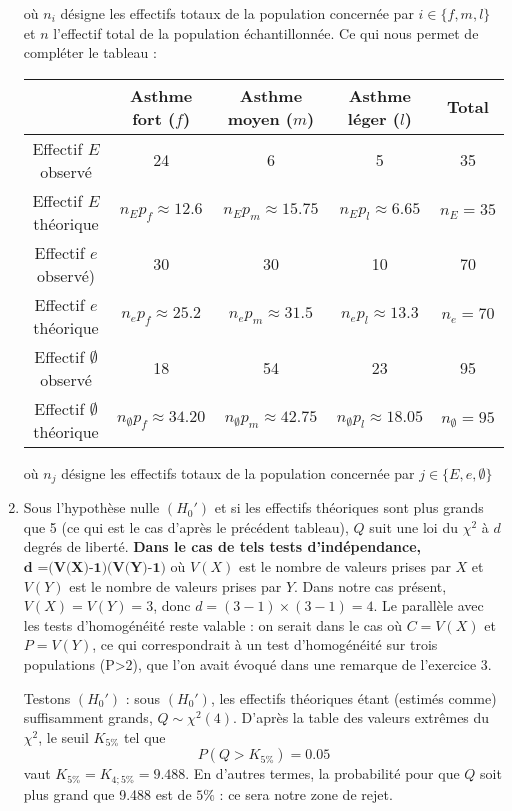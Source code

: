 \documentclass[a4paper,oneside,12pt]{article}
\theoremstyle{plain}
\begin{document}
\begin{enumerate}
    où $n_i$ désigne les effectifs totaux de la population concernée par $i \in \{f, m, l\}$ et $n$ l'effectif total de la population échantillonnée.
    \newpage
    Ce qui nous permet de compléter le tableau : 
    \begin{table}[h]
        \centering
        \begin{tabular}{|c|c|c|c|c|}
            \hline
             & Asthme fort ($f$) & Asthme moyen ($m$) & Asthme léger ($l$) & Total \\
            \hline
            Effectif $E$ observé & 24 & 6 & 5 & 35\\
            \hline
            Effectif $E$ théorique & $n_Ep_f \approx 12.6$ & $n_Ep_m \approx 15.75$ &  $n_Ep_{l} \approx 6.65$ & $n_E = 35$\\
            \hline
            Effectif $e$ observé) & 30 & 30 & 10  & 70\\
            \hline
            Effectif $e$ théorique & $n_ep_f \approx 25.2$ & $n_ep_m \approx 31.5$ &  $n_ep_{l} \approx 13.3$ & $n_e = 70$\\
            \hline
            Effectif $\emptyset$ observé & 18 & 54 & 23 & 95\\
            \hline
            Effectif $\emptyset$ théorique & $n_\emptyset p_f \approx 34.20$ & $n_\emptyset p_m \approx 42.75$ &  $n_\emptyset p_{l} \approx 18.05$ & $n_\emptyset = 95$\\
            \hline
    \end{tabular}
    \end{table}
    
    où $n_j$ désigne les effectifs totaux de la population concernée par $j \in \{E, e, \emptyset\}$

   \item Sous l'hypothèse nulle $(H_0')$ et si les effectifs théoriques sont plus grands que 5 (ce qui est le cas d'après le précédent tableau), $Q$ suit une loi du $\chi^2$ à $d$ degrés de liberté. \textbf{Dans le cas de tels tests d'indépendance, $\textbf{d =(V(X)-1)(V(Y)-1)}$} où $V(X)$ est le nombre de valeurs prises par $X$ et $V(Y)$ est le nombre de valeurs prises par $Y$. Dans notre cas présent, $V(X)=V(Y)=3$, donc $d =(3-1)\times(3-1) =4$. Le parallèle avec les tests d'homogénéité reste valable : on serait dans le cas où $C = V(X)$ et $P = V(Y)$, ce qui correspondrait à un test d'homogénéité sur trois populations (P>2), que l'on avait évoqué dans une remarque de l'exercice 3.

   Testons $(H_0')$ : sous $(H_0')$, les effectifs théoriques étant (estimés comme) suffisamment grands, $Q \sim \chi^2(4)$. D'après la table des valeurs extrêmes du $\chi^2$, le seuil $K_{5\%}$ tel que $$P(Q>K_{5\%}) = 0.05$$ vaut $K_{5\%}=K_{4;5\%} =9.488$. En d'autres termes, la probabilité pour que $Q$ soit plus grand que 9.488 est de $5\%$ : ce sera notre zone de rejet.


\end{enumerate}
\end{document}
